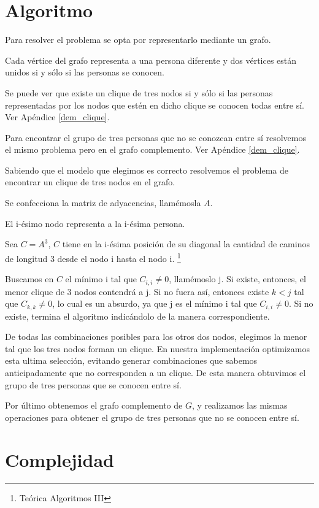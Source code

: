 \documentclass[a4paper, 12pt]{article}
\begin{document}
\section*{Algoritmo}


Para resolver el problema se opta por representarlo mediante un grafo.

Cada v\'ertice del grafo representa a una persona diferente y dos v\'ertices est\'an unidos si y s\'olo si las personas se conocen.


Se puede ver que existe un clique de tres nodos si y s\'olo si las personas representadas por los nodos que est\'en en dicho clique se conocen todas entre s\'i. Ver Ap\'endice \ref{dem_clique}.


Para encontrar el grupo de tres personas que no se conozcan entre s\'i resolvemos el mismo problema pero en el grafo complemento. Ver Ap\'endice \ref{dem_clique}.


Sabiendo que el modelo que elegimos es correcto resolvemos el problema de encontrar un clique de tres nodos en el grafo.


Se confecciona la matriz de adyacencias, llam\'emosla $A$.


El i-\'esimo nodo representa a la i-\'esima persona.


Sea $C = A^3$, $C$ tiene en la i-\'esima posici\'on de su diagonal la cantidad de caminos de longitud 3 desde el nodo i hasta el nodo i. \footnote{Te\'orica Algoritmos III}   

 
Buscamos en $C$ el m\'inimo i tal que $C_{i,i} \neq 0$, llam\'emoslo j. Si existe, entonces, el menor clique de 3 nodos contendr\'a a j. Si no fuera as\'i, entonces existe $k < j$ tal que $C_{k,k} \neq 0$, lo cual es un absurdo, ya que j es el m\'inimo i tal que $C_{i,i} \neq 0$. Si no existe, termina el algoritmo indic\'andolo de la manera correspondiente.


De todas las combinaciones posibles para los otros dos nodos, elegimos la menor tal que los tres nodos forman un clique. En nuestra implementaci\'on optimizamos esta ultima selecci\'on, evitando generar combinaciones que sabemos anticipadamente que no corresponden a un clique. De esta manera obtuvimos el grupo de tres personas que se conocen entre s\'i.


Por \'ultimo obtenemos el grafo complemento de $G$, y realizamos las mismas operaciones para obtener el grupo de tres personas que no se conocen entre s\'i.



\section*{Complejidad}
\end{document}
